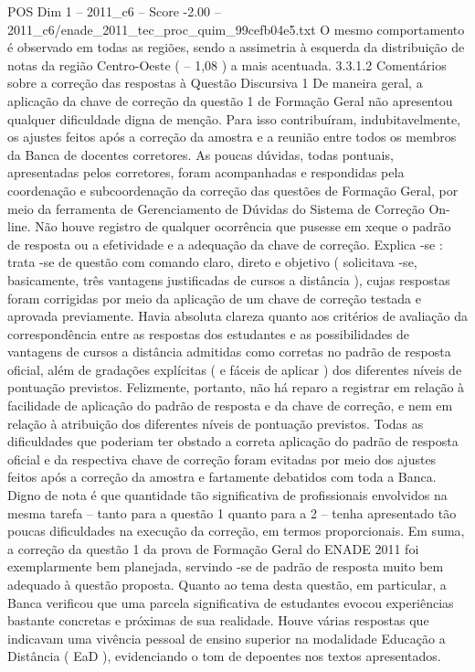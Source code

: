 \begin{textsample}{POS Dim 1 – 2011\_c6 – Score -2.00 – 2011\_c6/enade\_2011\_tec\_proc\_quim\_99cefb04e5.txt}
O mesmo comportamento é observado em todas as regiões, sendo a assimetria à esquerda da distribuição de notas da região Centro-Oeste ( – 1,08 ) a mais acentuada. 3.3.1.2 Comentários sobre a correção das respostas à Questão Discursiva 1 De maneira geral, a aplicação da chave de correção da questão 1 de Formação Geral não apresentou qualquer dificuldade digna de menção.
Para isso contribuíram, indubitavelmente, os ajustes feitos após a correção da amostra e a reunião entre todos os membros da Banca de docentes corretores.
As poucas dúvidas, todas pontuais, apresentadas pelos corretores, foram acompanhadas e respondidas pela coordenação e subcoordenação da correção das questões de Formação Geral, por meio da ferramenta de Gerenciamento de Dúvidas do Sistema de Correção On-line.
Não houve registro de qualquer ocorrência que pusesse em xeque o padrão de resposta ou a efetividade e a adequação da chave de correção.
Explica -se : trata -se de questão com comando claro, direto e objetivo ( solicitava -se, basicamente, três vantagens justificadas de cursos a distância ), cujas respostas foram corrigidas por meio da aplicação de um chave de correção testada e aprovada previamente.
Havia absoluta clareza quanto aos critérios de avaliação da correspondência entre as respostas dos estudantes e as possibilidades de vantagens de cursos a distância admitidas como corretas no padrão de resposta oficial, além de gradações explícitas ( e fáceis de aplicar ) dos diferentes níveis de pontuação previstos.
Felizmente, portanto, não há reparo a registrar em relação à facilidade de aplicação do padrão de resposta e da chave de correção, e nem em relação à atribuição dos diferentes níveis de pontuação previstos.
Todas as dificuldades que poderiam ter obstado a correta aplicação do padrão de resposta oficial e da respectiva chave de correção foram evitadas por meio dos ajustes feitos após a correção da amostra e fartamente debatidos com toda a Banca.
Digno de nota é que quantidade tão significativa de profissionais envolvidos na mesma tarefa – tanto para a questão 1 quanto para a 2 – tenha apresentado tão poucas dificuldades na execução da correção, em termos proporcionais.
Em suma, a correção da questão 1 da prova de Formação Geral do ENADE 2011 foi exemplarmente bem planejada, servindo -se de padrão de resposta muito bem adequado à questão proposta.
Quanto ao tema desta questão, em particular, a Banca verificou que uma parcela significativa de estudantes evocou experiências bastante concretas e próximas de sua realidade.
Houve várias respostas que indicavam uma vivência pessoal de ensino superior na modalidade Educação a Distância ( EaD ), evidenciando o tom de depoentes nos textos apresentados.

\end{textsample}
